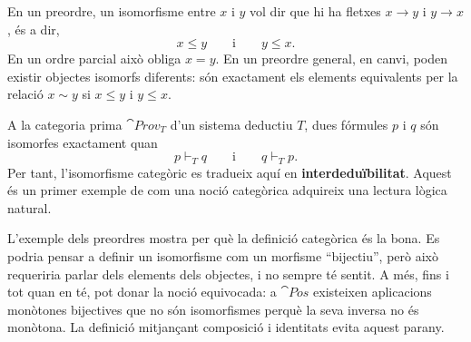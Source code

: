 \begin{exemple}
En un preordre, un isomorfisme entre $x$ i $y$ vol dir que hi ha fletxes $x\to y$ i $y\to x$, és a dir,
\[
x\le y
\qquad\text{i}\qquad
y\le x.
\]
En un ordre parcial això obliga $x=y$. En un preordre general, en canvi, poden existir objectes isomorfs diferents: són exactament els elements equivalents per la relació $x\sim y$ si $x\le y$ i $y\le x$.
\end{exemple}

\begin{exemple}\label{ex:iso-equivalencia-logica}
A la categoria prima $\cat{Prov}_T$ d'un sistema deductiu $T$, dues fórmules $p$ i $q$ són isomorfes exactament quan
\[
p\vdash_T q
\qquad\text{i}\qquad
q\vdash_T p.
\]
Per tant, l'isomorfisme categòric es tradueix aquí en \textbf{interdeduïbilitat}. Aquest és un primer exemple de com una noció categòrica adquireix una lectura lògica natural.
\end{exemple}

\begin{observacio}
L'exemple dels preordres mostra per què la definició categòrica és la bona. Es podria pensar a definir un isomorfisme com un morfisme \enquote{bijectiu}, però això requeriria parlar dels elements dels objectes, i no sempre té sentit. A més, fins i tot quan en té, pot donar la noció equivocada: a $\cat{Pos}$ existeixen aplicacions monòtones bijectives que no són isomorfismes perquè la seva inversa no és monòtona. La definició mitjançant composició i identitats evita aquest parany.
\end{observacio}

